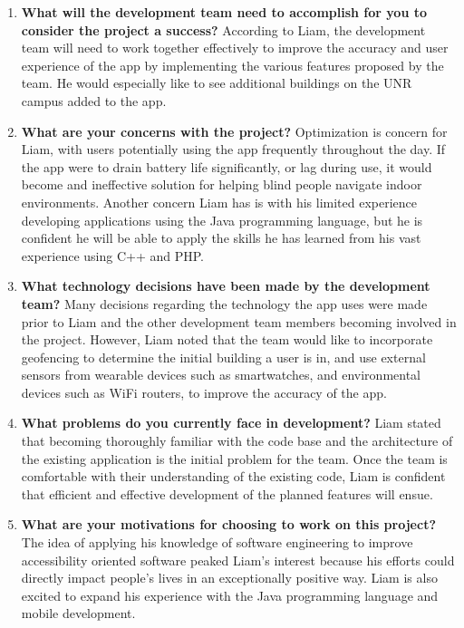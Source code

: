 \documentclass{scrreprt}
\begin{document}
\begin{enumerate}
 
\item \textbf{What will the development team need to accomplish for you to consider the project a success?}
According to Liam, the development team will need to work together effectively to improve the accuracy and user experience of the app by implementing the various features proposed by the team. He would especially like to see additional buildings on the UNR campus added to the app.


\item \textbf{What are your concerns with the project?}
Optimization is concern for Liam, with users potentially using the app frequently throughout the day. If the app were to drain battery life significantly, or lag during use, it would become and ineffective solution for helping blind people navigate indoor environments. Another concern Liam has is with his limited experience developing applications using the Java programming language, but he is confident he will be able to apply the skills he has learned from his vast experience using C++ and PHP.


\item \textbf{What technology decisions have been made by the development team?}
Many decisions regarding the technology the app uses were made prior to Liam and the other development team members becoming involved in the project. However, Liam noted that the team would like to incorporate geofencing to determine the initial building a user is in, and use external sensors from wearable devices such as smartwatches, and environmental devices such as WiFi routers, to improve the accuracy of the app.


\item \textbf{What problems do you currently face in development?}
Liam stated that becoming thoroughly familiar with the code base and the architecture of the existing application is the initial problem for the team. Once the team is comfortable with their understanding of the existing code, Liam is confident that efficient and effective development of the planned features will ensue.


\item \textbf{What are your motivations for choosing to work on this project?}
The idea of applying his knowledge of software engineering to improve accessibility oriented software peaked Liam’s interest because his efforts could directly impact people's lives in an exceptionally positive way. Liam is also excited to expand his experience with the Java programming language and mobile development.



\end{enumerate}
\end{document}

